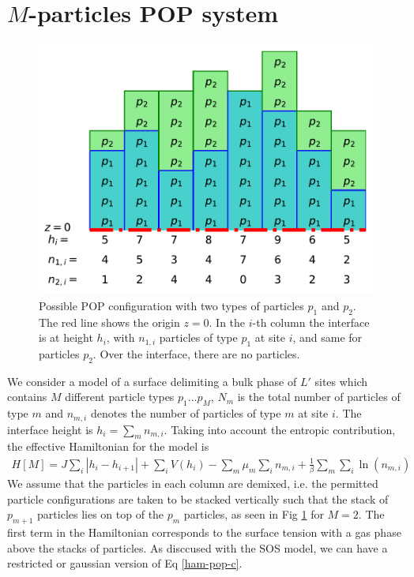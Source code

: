     \section{$M$-particles POP system}


\begin{figure}
    \centering
    \includegraphics[width=0.7\linewidth]{pop/figure-pop.pdf}
    \caption{Possible POP configuration with two types of particles $p_1$ and $p_2$. The red line shows the origin $z=0$. In the $i$-th column the interface is at height $h_i$, with $n_{1,i}$ particles of type $p_1$ at site $i$, and same for particles $p_2$. Over the interface, there are no particles. }
    \label{fig-pop}
\end{figure}

We consider a model of a surface delimiting a bulk phase of $L'$  sites which contains $M$ different particle types $p_1 ... p_M$, $N_m$ is the total number of particles of type $m$ and $n_{m,i}$ denotes the number of particles of type $m$ at site $i$. The interface height is $h_i = \sum_m n_{m,i}$. Taking into account the entropic contribution, the effective Hamiltonian for the model is
\begin{align}
    H[M] = J \sum_i |h_i-h_{i+1}| + \sum_i V(h_i) - \sum_m \mu_m \sum_i n_{m,i} + \frac{1}{\beta} \sum_m \sum_i \ln(n_{m,i})
    \label{ham-pop-c}
\end{align}
We assume that the particles in each column are demixed, i.e. the permitted particle configurations are taken to be stacked vertically such that the stack of $p_{m+1}$ particles lies on top  of the $p_m$ particles, as seen in Fig \ref{fig-pop} for $M=2$. The first term in the Hamiltonian corresponds to the surface tension with a gas phase above the stacks of particles. As disccused with the SOS model, we can have a restricted or gaussian version of Eq \ref{ham-pop-c}. 

